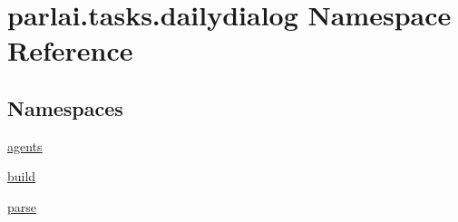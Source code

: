 \hypertarget{namespaceparlai_1_1tasks_1_1dailydialog}{}\section{parlai.\+tasks.\+dailydialog Namespace Reference}
\label{namespaceparlai_1_1tasks_1_1dailydialog}
\subsection*{Namespaces}
\begin{DoxyCompactItemize}
\item 
 \hyperlink{namespaceparlai_1_1tasks_1_1dailydialog_1_1agents}{agents}
\item 
 \hyperlink{namespaceparlai_1_1tasks_1_1dailydialog_1_1build}{build}
\item 
 \hyperlink{namespaceparlai_1_1tasks_1_1dailydialog_1_1parse}{parse}
\end{DoxyCompactItemize}
